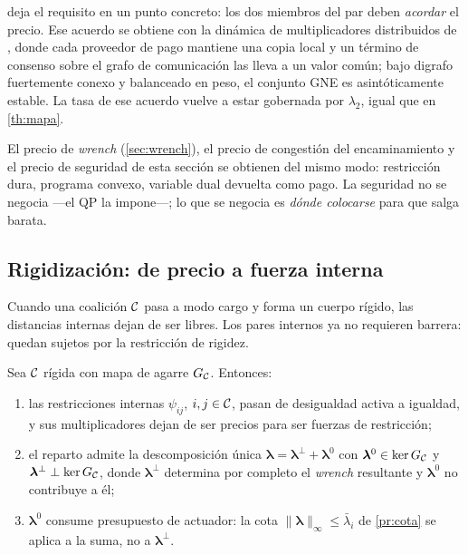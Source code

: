  deja el requisito en un punto concreto: los dos
miembros del par deben \emph{acordar} el precio. Ese acuerdo se obtiene con la
dinámica de multiplicadores distribuidos de \cite{martinezPiazuelo2025gne},
donde cada proveedor de pago mantiene una copia local y un término de consenso
sobre el grafo de comunicación las lleva a un valor común; bajo digrafo
fuertemente conexo y balanceado en peso, el conjunto GNE es asintóticamente
estable. La tasa de ese acuerdo vuelve a estar gobernada por $\lambda_2$, igual
que en \cref{th:mapa}.

\begin{observacion}
El precio de \emph{wrench} (\cref{sec:wrench}), el precio de congestión del
encaminamiento y el precio de seguridad de esta sección se obtienen del mismo
modo: restricción dura, programa convexo, variable dual devuelta como pago. La
seguridad no se negocia —el QP la impone—; lo que se negocia es \emph{dónde
colocarse} para que salga barata.
\end{observacion}

\subsection{Rigidización: de precio a fuerza interna}

Cuando una coalición $\mathcal{C}$ pasa a modo \textsf{cargo} y forma un cuerpo
rígido, las distancias internas dejan de ser libres. Los pares internos ya no
requieren barrera: quedan sujetos por la restricción de rigidez.

\begin{teorema}
\label{th:rigidizacion}
Sea $\mathcal{C}$ rígida con mapa de agarre $G_{\mathcal{C}}$. Entonces:
\begin{enumerate}[label=(\alph*),leftmargin=2.2em,topsep=0.2em,itemsep=0.15em]
  \item las restricciones internas $\psi_{ij}$, $i,j\in\mathcal{C}$, pasan de
  desigualdad activa a igualdad, y sus multiplicadores dejan de ser precios
  para ser fuerzas de restricción;
  \item el reparto admite la descomposición única
  $\bm\lambda=\bm\lambda^{\perp}+\bm\lambda^{0}$ con
  $\bm\lambda^{0}\in\ker G_{\mathcal{C}}$ y
  $\bm\lambda^{\perp}\perp\ker G_{\mathcal{C}}$, donde $\bm\lambda^{\perp}$ determina
  por completo el \emph{wrench} resultante y $\bm\lambda^{0}$ no contribuye a
  él;
  \item $\bm\lambda^{0}$ consume presupuesto de actuador: la cota
  $\|\bm\lambda\|_\infty\le\bar\lambda_i$ de \cref{pr:cota} se aplica a la suma,
  no a $\bm\lambda^{\perp}$.
\end{enumerate}
\end{teorema}

